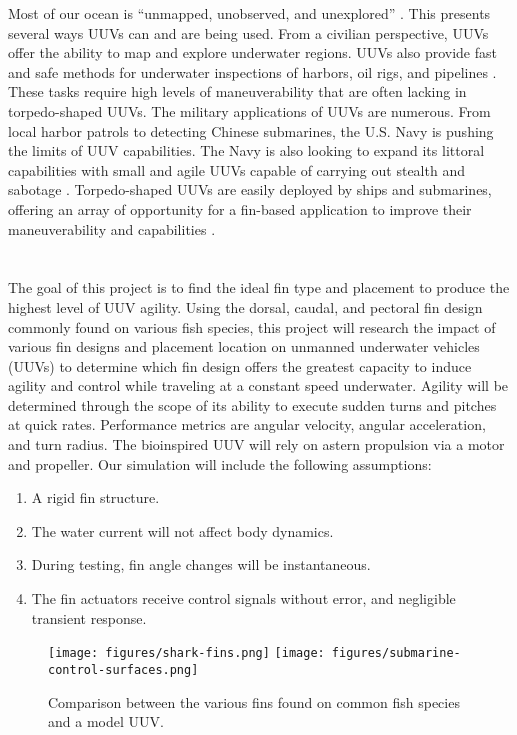 \documentclass{IEEEtran}
\begin{document}
Most of our ocean is ``unmapped, unobserved, and unexplored'' \cite{noaa2009how}. This presents several ways UUVs can and are being used. From a civilian perspective, UUVs offer the ability to map and explore underwater regions. UUVs also provide fast and safe methods for underwater inspections of harbors, oil rigs, and pipelines \cite{maslin2020raising}. These tasks require high levels of maneuverability that are often lacking in torpedo-shaped UUVs. The military applications of UUVs are numerous. From local harbor patrols to detecting Chinese submarines, the U.S. Navy is pushing the limits of UUV capabilities. The Navy is also looking to expand its littoral capabilities with small and agile UUVs capable of carrying out stealth and sabotage \cite{berenice2018splash}. Torpedo-shaped UUVs are easily deployed by ships and submarines, offering an array of opportunity for a fin-based application to improve their maneuverability and capabilities \cite{orourke2020navy}.





\section{}
The goal of this project is to find the ideal fin type and placement to produce the highest level of UUV agility. Using the dorsal, caudal, and pectoral fin design commonly found on various fish species, this project will research the impact of various fin designs and placement location on unmanned underwater vehicles (UUVs) to determine which fin design offers the greatest capacity to induce agility and control while traveling at a constant speed underwater. Agility will be determined through the scope of its ability to execute sudden turns and pitches at quick rates. Performance metrics are angular velocity, angular acceleration, and turn radius. The bioinspired UUV will rely on astern propulsion via a motor and propeller. Our simulation will include the following assumptions:
\begin{enumerate}
\item A rigid fin structure.
\item The water current will not affect body dynamics.
\item During testing, fin angle changes will be instantaneous.
\item The fin actuators receive control signals without error, and negligible transient response.
\end{enumerate}
\begin{figure*}
\begin{center}
\texttt{[image: figures/shark-fins.png]}
\texttt{[image: figures/submarine-control-surfaces.png]}
\end{center}
\caption{Comparison between the various fins found on common fish species and a model UUV.}
\label{fig:3}
\end{figure*}
\end{document}
